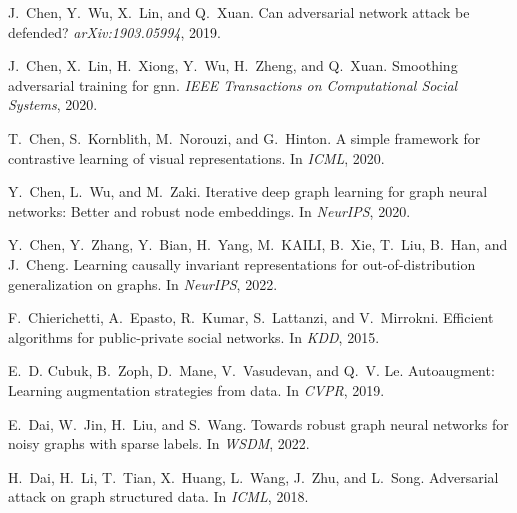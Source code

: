 \documentclass[11pt]{article}
\begin{document}
\begin{thebibliography}{10}
\begin{small}
J.~Chen, Y.~Wu, X.~Lin, and Q.~Xuan.
\newblock Can adversarial network attack be defended?
\newblock \emph{arXiv:1903.05994}, 2019.

J.~Chen, X.~Lin, H.~Xiong, Y.~Wu, H.~Zheng, and Q.~Xuan.
\newblock Smoothing adversarial training for gnn.
\newblock \emph{IEEE Transactions on Computational Social Systems},
  2020{}.

T.~Chen, S.~Kornblith, M.~Norouzi, and G.~Hinton.
\newblock A simple framework for contrastive learning of visual
  representations.
\newblock In \emph{ICML}, 2020{}.

Y.~Chen, L.~Wu, and M.~Zaki.
\newblock Iterative deep graph learning for graph neural networks: Better and
  robust node embeddings.
\newblock In \emph{NeurIPS}, 2020{}.

Y.~Chen, Y.~Zhang, Y.~Bian, H.~Yang, M.~KAILI, B.~Xie, T.~Liu, B.~Han, and
  J.~Cheng.
\newblock Learning causally invariant representations for out-of-distribution
  generalization on graphs.
\newblock In \emph{NeurIPS}, 2022.

F.~Chierichetti, A.~Epasto, R.~Kumar, S.~Lattanzi, and V.~Mirrokni.
\newblock Efficient algorithms for public-private social networks.
\newblock In \emph{KDD}, 2015.

E.~D. Cubuk, B.~Zoph, D.~Mane, V.~Vasudevan, and Q.~V. Le.
\newblock Autoaugment: Learning augmentation strategies from data.
\newblock In \emph{CVPR}, 2019.

E.~Dai, W.~Jin, H.~Liu, and S.~Wang.
\newblock Towards robust graph neural networks for noisy graphs with sparse
  labels.
\newblock In \emph{WSDM}, 2022.

H.~Dai, H.~Li, T.~Tian, X.~Huang, L.~Wang, J.~Zhu, and L.~Song.
\newblock Adversarial attack on graph structured data.
\newblock In \emph{ICML}, 2018.


\end{small}
\end{thebibliography}
\end{document}
